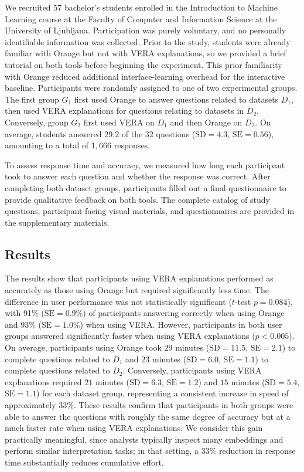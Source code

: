 \documentclass[lettersize,journal]{IEEEtran}
\begin{document}
We recruited 57 bachelor's students enrolled in the Introduction to Machine Learning course at the Faculty of Computer and Information Science at the University of Ljubljana.
Participation was purely voluntary, and no personally identifiable information was collected.
Prior to the study, students were already familiar with Orange but not with VERA explanations, so we provided a brief tutorial on both tools before beginning the experiment. This prior familiarity with Orange reduced additional interface-learning overhead for the interactive baseline.
Participants were randomly assigned to one of two experimental groups. The first group $G_1$ first used Orange to answer questions related to datasets $D_1$, then used VERA explanations for questions relating to datasets in $D_2$. Conversely, group $G_2$ first used VERA on $D_1$ and then Orange on $D_2$. On average, students answered $29.2$ of the $32$ questions ($\text{SD}= 4.3$, $\text{SE}=0.56$), amounting to a total of $1,666$ responses.

To assess response time and accuracy, we measured how long each participant took to answer each question and whether the response was correct. After completing both dataset groups, participants filled out a final questionnaire to provide qualitative feedback on both tools. The complete catalog of study questions, participant-facing visual materials, and questionnaires are provided in the supplementary materials.

\subsection{Results}
\label{sec:user-study:results}

The results show that participants using VERA explanations performed as accurately as those using Orange but required significantly less time.
The difference in user performance was not statistically significant ($t$-test $p=0.084$), with 91\% ($\text{SE}=0.9\%$) of participants answering correctly when using Orange and 93\% ($\text{SE}=1.0\%$) when using VERA.
However, participants in both user groups answered significantly faster when using VERA explanations ($p<0.005$). On average, participants using Orange took $29$ minutes ($\text{SD}= 11.5$, $\text{SE}=2.1$) to complete questions related to $D_1$ and $23$ minutes ($\text{SD}= 6.0$, $\text{SE}=1.1$) to complete questions related to $D_2$. Conversely, participants using VERA explanations required $21$ minutes ($\text{SD}= 6.3$, $\text{SE}=1.2$) and $15$ minutes ($\text{SD}=5.4$, $\text{SE}=1.1$) for each dataset group, representing a consistent increase in speed of approximately 33\%.
These results confirm that participants in both groups were able to answer the questions with roughly the same degree of accuracy but at a much faster rate when using VERA explanations.
We consider this gain practically meaningful, since analysts typically inspect many embeddings and perform similar interpretation tasks; in that setting, a 33\% reduction in response time substantially reduces cumulative effort.
\end{document}
